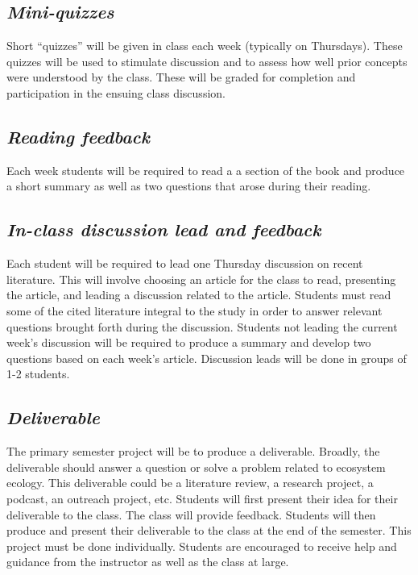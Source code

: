 \documentclass[12pt, notitlepage]{article}   	%
\begin{document}
{\subsection{\textit{Mini-quizzes}}
Short “quizzes” will be given in class each week (typically on Thursdays). 
These quizzes will be used to stimulate discussion and to assess how well 
prior concepts were understood by the class. 
These will be graded for completion and participation in the ensuing class discussion.

\subsection{\textit{Reading feedback}}
Each week students will be required to read a a section of the book 
and produce a short summary as well as two questions that arose during their 
reading. 

\subsection{\textit{In-class discussion lead and feedback}}
Each student will be required to lead one Thursday discussion on recent literature. 
This will involve choosing an article for the class to read, presenting the article, 
and leading a discussion related to the article. Students must read some of the cited
literature integral to the study 
in order to answer relevant questions brought forth during the discussion.
Students not leading the current week’s 
discussion will be required to produce a summary and 
develop two questions based on each week’s article.
Discussion leads will be done in groups of 1-2 students.

\subsection{\textit{Deliverable}}
The primary semester project will be to produce a deliverable.
Broadly, the deliverable should answer a question or solve a problem related 
to ecosystem ecology.
This deliverable could be a literature review, a research project, a podcast, 
an outreach project, etc. Students will first present their idea for their deliverable 
to the class. The class will provide feedback. Students will then produce and present 
their deliverable to the class at the end of the semester. This project must be done 
individually. Students are encouraged to receive help and guidance 
from the instructor as well as the class at large. 

}
\end{document}
